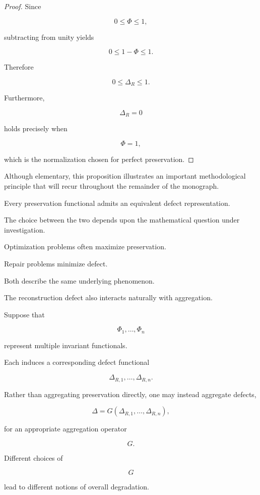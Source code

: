 \documentclass[11pt]{book}
\numberwithin{equation}{chapter}
\theoremstyle{definition}
\theoremstyle{plain}
\begin{document}
\begin{proof}

Since

\[
0\le\Phi\le1,
\]

subtracting from unity yields

\[
0
\le
1-\Phi
\le
1.
\]

Therefore

\[
0
\le
\Delta_R
\le
1.
\]

Furthermore,

\[
\Delta_R=0
\]

holds precisely when

\[
\Phi=1,
\]

which is the normalization chosen for perfect preservation.

\end{proof}

Although elementary, this proposition illustrates an important methodological principle that will recur throughout the remainder of the monograph.

Every preservation functional admits an equivalent defect representation.

The choice between the two depends upon the mathematical question under investigation.

Optimization problems often maximize preservation.

Repair problems minimize defect.

Both describe the same underlying phenomenon.

The reconstruction defect also interacts naturally with aggregation.

Suppose that

\[
\Phi_1,\ldots,\Phi_n
\]

represent multiple invariant functionals.

Each induces a corresponding defect functional

\[
\Delta_{R,1},
\ldots,
\Delta_{R,n}.
\]

Rather than aggregating preservation directly, one may instead aggregate defects,

\[
\Delta
=
G(
\Delta_{R,1},
\ldots,
\Delta_{R,n}
),
\]

for an appropriate aggregation operator

\[
G.
\]

Different choices of

\[
G
\]

lead to different notions of overall degradation.
\end{document}
